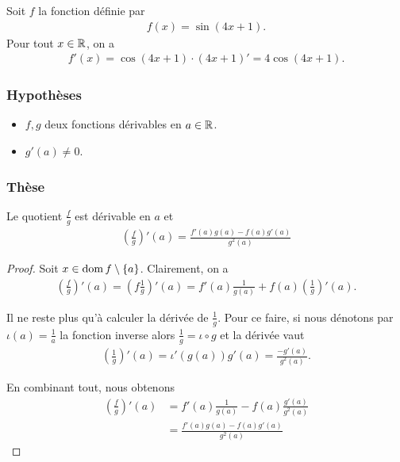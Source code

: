\documentclass[main.tex]{subfiles}
\begin{document}
\begin{example}
    Soit $f$ la fonction définie par 
    \begin{align}
        f(x) = \sin (4x + 1).
    \end{align}
    Pour tout $x \in \mathbb{R}$, on a 
    \begin{align}
        f'(x) = \cos (4x + 1) \cdot (4x + 1)' = 4\cos (4x + 1).
    \end{align}
\end{example}

\begin{proposition}

    \subsubsection{Hypothèses}

    \begin{itemize}
        \item $f, g$ deux fonctions dérivables en $a \in \mathbb{R}$.
        \item $g'(a) \neq 0$.
    \end{itemize}

    \subsubsection{Thèse}

    Le quotient $\frac f g$ est dérivable en $a$ et
    \begin{align}
        \left(\frac f g\right)'(a) = \frac {f'(a) g(a) - f(a) g'(a)} {g^2(a)}
    \end{align}
\end{proposition}
\begin{proof}
    Soit $x \in \operatorname{dom} f \setminus \{a\}$.
    Clairement,
    on a
    \begin{align}
        \left(\frac f g\right)'(a)
        = \left(f \frac 1 g\right)'(a)
        = f'(a) \frac 1 {g(a)} + f(a) \left(\frac 1 g\right)'(a).
    \end{align}

    Il ne reste plus qu'à calculer la dérivée de $\frac 1 g$.
    Pour ce faire,
    si nous dénotons par $\iota(a) = \frac 1 a$ la fonction inverse
    alors $\frac 1 g = \iota \circ g$ et la dérivée vaut
    \begin{align}
        \left(\frac 1 g\right)'(a) = \iota'(g(a)) g'(a) = \frac {-g'(a)} {g^2(a)}.
    \end{align}

    En combinant tout,
    nous obtenons
    \begin{align}
        \left(\frac f g\right)'(a)
        &= f'(a) \frac 1 {g(a)} - f(a) \frac {g'(a)} {g^2(a)}\\
        &= \frac {f'(a) g(a) - f(a) g'(a)} {g^2(a)}
    \end{align}
\end{proof}
\end{document}
